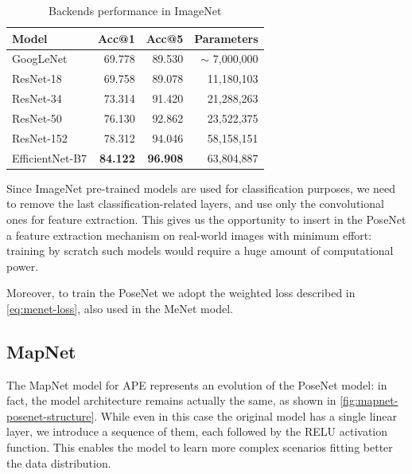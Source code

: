 \begin{table}[htbp]
    \caption{Backends performance in ImageNet}
    \begin{center}
        \begin{tabular}{lrrr}
            \toprule
            Model           & Acc@1           & Acc@5           & Parameters      \\
            \midrule
            GoogLeNet       & 69.778          & 89.530          & $\sim$ 7,000,000\\
            ResNet-18       & 69.758          & 89.078          & 11,180,103      \\
            ResNet-34       & 73.314          & 91.420          & 21,288,263      \\
            ResNet-50       & 76.130          & 92.862          & 23,522,375      \\
            ResNet-152      & 78.312          & 94.046          & 58,158,151      \\
            EfficientNet-B7 & \textbf{84.122} & \textbf{96.908} & 63,804,887      \\
            \bottomrule
        \end{tabular}
        \label{tab:backend-performance-imagenet}
    \end{center}
\end{table}

Since ImageNet pre-trained models are used for classification purposes, we need to remove the last classification-related layers, and use only the convolutional ones for feature extraction. This gives us the opportunity to insert in the PoseNet a feature extraction mechanism on real-world images with minimum effort: training by scratch such models would require a huge amount of computational power.

Moreover, to train the PoseNet we adopt the weighted loss described in \cref{eq:menet-loss}, also used in the MeNet model.

\subsection{MapNet}
The MapNet model for APE represents an evolution of the PoseNet model: in fact, the model architecture remains actually the same, as shown in \cref{fig:mapnet-posenet-structure}. While even in this case the original model has a single linear layer, we introduce a sequence of them, each followed by the RELU activation function. This enables the model to learn more complex scenarios fitting better the data distribution.

